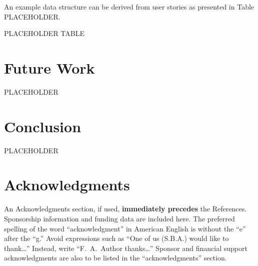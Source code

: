 \documentclass[conf]{new-aiaa}
\begin{document}
An example data structure can be derived from user stories as presented in Table PLACEHOLDER.

PLACEHOLDER TABLE

\section{Future Work}

PLACEHOLDER

\section{Conclusion}

PLACEHOLDER

\section*{Acknowledgments}
An Acknowledgments section, if used, \textbf{immediately precedes} the References. Sponsorship information and funding data are included here. The preferred spelling of the word ``acknowledgment'' in American English is without the ``e'' after the ``g.'' Avoid expressions such as ``One of us (S.B.A.) would like to thank\ldots'' Instead, write ``F.~A.~Author thanks\ldots'' Sponsor and financial support acknowledgments are also to be listed in the ``acknowledgments'' section.


\end{document}
